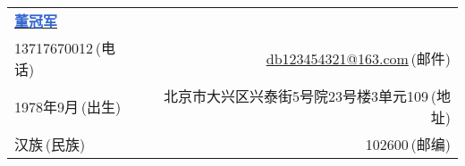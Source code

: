 \newcommand{\myheader}{
    \begin{tabular*}{\textwidth}{l@{\extracolsep{\fill}}r}
        \textbf{\href{https://herechen.github.io}{\LARGE \textcolor{highlight}{董冠军}}} \\
        13717670012$\,${\color{labelgrey}(电话)} & \href{mailto:db123454321@163.com}{db123454321@163.com}$\,${\color{labelgrey}(邮件)} \\
        1978年9月$\,${\color{labelgrey}(出生)} & 北京市大兴区兴泰街5号院23号楼3单元109$\,${\color{labelgrey}(地址)} \\
        汉族$\,${\color{labelgrey}(民族)} & 102600$\,${\color{labelgrey}(邮编)} \\
    \end{tabular*}\\\vspace{0.1in}}

\myheader
